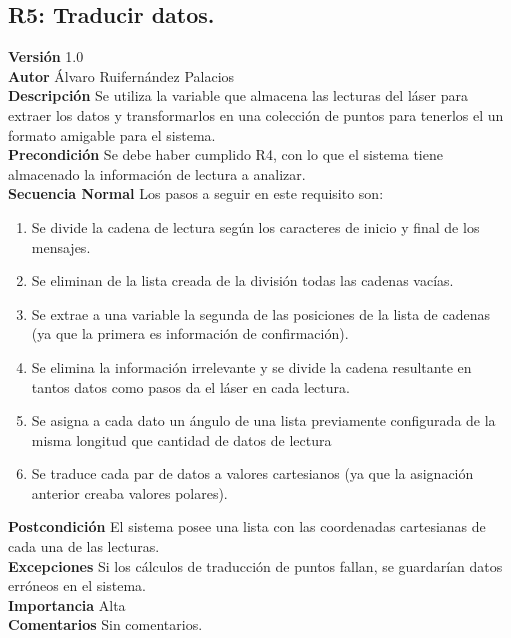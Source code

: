 \subsection{R5: Traducir datos.}
\textbf{Versión} 1.0\\
\textbf{Autor} Álvaro Ruifernández Palacios\\
\textbf{Descripción} Se utiliza la variable que almacena las lecturas del láser para extraer los datos y transformarlos en una colección de puntos para tenerlos el un formato amigable para el sistema.\\
\textbf{Precondición} Se debe haber cumplido R4, con lo que el sistema tiene almacenado la información de lectura a analizar.\\
\textbf{Secuencia Normal} Los pasos a seguir en este requisito son:
\begin{enumerate}
	\item Se divide la cadena de lectura según los caracteres de inicio y final de los mensajes.
	\item Se eliminan de la lista creada de la división todas las cadenas vacías.
	\item Se extrae a una variable la segunda de las posiciones de la lista de cadenas (ya que la primera es información de confirmación).
	\item Se elimina la información irrelevante y se divide la cadena resultante en tantos datos como pasos da el láser en cada lectura.
	\item Se asigna a cada dato un ángulo de una lista previamente configurada de la misma longitud que cantidad de datos de lectura
	\item Se traduce cada par de datos a valores cartesianos (ya que la asignación anterior creaba valores polares).
\end{enumerate}
\textbf{Postcondición} El sistema posee una lista con las coordenadas cartesianas de cada una de las lecturas.\\
\textbf{Excepciones} Si los cálculos de traducción de puntos fallan, se guardarían datos erróneos en el sistema.\\
\textbf{Importancia} Alta\\
\textbf{Comentarios} Sin comentarios.\\

